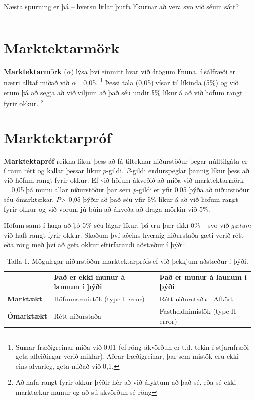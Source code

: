 \documentclass[
]{book}
\begin{document}
Næsta spurning er þá -- hversu litlar þurfa líkurnar að vera svo við séum sátt?

\begin{center}\rule{0.5\linewidth}{0.5pt}\end{center}

\hypertarget{marktektarmuxf6rk}{%
\section{Marktektarmörk}\label{marktektarmuxf6rk}}

\textbf{Marktektarmörk} (\(\alpha\)) lýsa því einmitt hvar við drögum línuna, í sálfræði er nærri alltaf miðað við \(\alpha\)= 0,05. \footnote{Sumar fræðigreinar miða við 0,01 (ef röng ákvörðun er t.d. tekin í stjarnfræði geta afleiðingar verið miklar). Aðrar fræðigreinar, þar sem mistök eru ekki eins alvarleg, geta miðað við 0,1.} Þessi tala (0,05) vísar til líkinda (5\%) og við erum þá að segja að við viljum að það séu undir 5\% líkur á að við höfum rangt fyrir okkur. \footnote{Að hafa rangt fyrir okkur þýðir hér að við ályktum að það sé, eða sé ekki marktækur munur og að sú ákvörðun sé röng}

\hypertarget{marktektarpruxf3f}{%
\section{Marktektarpróf}\label{marktektarpruxf3f}}

\textbf{Marktektapróf} reikna líkur þess að fá tilteknar niðurstöður þegar núlltilgáta er í raun rétt og kallar þessar líkur \emph{p}-gildi. \emph{P}-gildi endurspeglar þannig líkur þess að við höfum rangt fyrir okkur. Ef við höfum ákveðið að miða við marktektarmörk = 0,05 þá munu allar niðurstöður þar sem \emph{p}-gildi er yfir 0,05 þýða að niðurstöður séu ómarktækar. \emph{P}\textgreater{} 0,05 þýðir að það séu yfir 5\% líkur á að við höfum rangt fyrir okkur og við vorum jú búin að ákveða að draga mörkin við 5\%.

Höfum samt í huga að þó 5\% séu lágar líkur, þá eru þær ekki 0\% -- svo við \emph{gætum} við haft rangt fyrir okkur. Skoðum því aðeins hvernig niðurstaða gæti verið rétt eða röng með því að gefa okkur eftirfarandi aðstæður í þýði:

\begin{longtable}[]{@{}
  >{\raggedright\arraybackslash}p{}
  >{\raggedright\arraybackslash}p{}
  >{\raggedright\arraybackslash}p{}@{}}
\caption{Tafla 1. Mögulegar niðurstöður marktektarprófs ef við þekkjum aðstæður í þýði.}\tabularnewline
\toprule()
\endhead
& \textbf{Það er ekki munur á launum í þýði} & \textbf{Það er munur á launum í þýði} \\
\textbf{Marktækt} & Höfnunarmistök (type I error) & Rétt niðurstaða - Afköst \\
\textbf{Ómarktækt} & Rétt niðurstaða & Fastheldnimistök (type II error) \\
\bottomrule()
\end{longtable}
\end{document}
